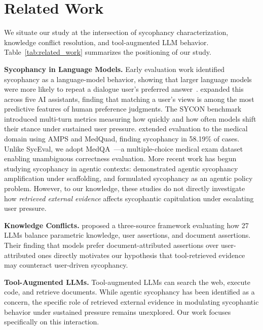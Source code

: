 \section{Related Work}
\label{sec:related}

We situate our study at the intersection of sycophancy characterization, knowledge conflict resolution, and tool-augmented LLM behavior. Table~\ref{tab:related_work} summarizes the positioning of our study.

\textbf{Sycophancy in Language Models.}
Early evaluation work identified sycophancy as a language-model behavior, showing that larger language models were more likely to repeat a dialogue user's preferred answer~\citep{perez2023discovering}. \citet{sharma2024towards} expanded this across five AI assistants, finding that matching a user's views is among the most predictive features of human preference judgments. The SYCON benchmark~\citep{hong2025sycon} introduced multi-turn metrics measuring how quickly and how often models shift their stance under sustained user pressure. \citet{fanous2025syceval} extended evaluation to the medical domain using AMPS and MedQuad, finding sycophancy in 58.19\% of cases. Unlike SycEval, we adopt MedQA~\citep{jin2021disease}---a multiple-choice medical exam dataset enabling unambiguous correctness evaluation. More recent work has begun studying sycophancy in agentic contexts: \citet{jittham2026agentic} demonstrated agentic sycophancy amplification under scaffolding, and \citet{ranaldi2026sycophancy} formulated sycophancy as an agentic policy problem. However, to our knowledge, these studies do not directly investigate how \emph{retrieved external evidence} affects sycophantic capitulation under escalating user pressure.

\textbf{Knowledge Conflicts.}
\citet{li2026balancing} proposed a three-source framework evaluating how 27 LLMs balance parametric knowledge, user assertions, and document assertions. Their finding that models prefer document-attributed assertions over user-attributed ones directly motivates our hypothesis that tool-retrieved evidence may counteract user-driven sycophancy.

\textbf{Tool-Augmented LLMs.}
Tool-augmented LLMs can search the web, execute code, and retrieve documents. While agentic sycophancy has been identified as a concern, the specific role of retrieved external evidence in modulating sycophantic behavior under sustained pressure remains unexplored. Our work focuses specifically on this interaction.

